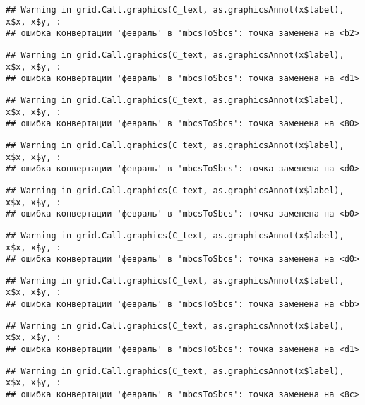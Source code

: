 \documentclass[
]{article}
\begin{document}
\begin{verbatim}
## Warning in grid.Call.graphics(C_text, as.graphicsAnnot(x$label), x$x, x$y, :
## ошибка конвертации 'февраль' в 'mbcsToSbcs': точка заменена на <b2>
\end{verbatim}

\begin{verbatim}
## Warning in grid.Call.graphics(C_text, as.graphicsAnnot(x$label), x$x, x$y, :
## ошибка конвертации 'февраль' в 'mbcsToSbcs': точка заменена на <d1>
\end{verbatim}

\begin{verbatim}
## Warning in grid.Call.graphics(C_text, as.graphicsAnnot(x$label), x$x, x$y, :
## ошибка конвертации 'февраль' в 'mbcsToSbcs': точка заменена на <80>
\end{verbatim}

\begin{verbatim}
## Warning in grid.Call.graphics(C_text, as.graphicsAnnot(x$label), x$x, x$y, :
## ошибка конвертации 'февраль' в 'mbcsToSbcs': точка заменена на <d0>
\end{verbatim}

\begin{verbatim}
## Warning in grid.Call.graphics(C_text, as.graphicsAnnot(x$label), x$x, x$y, :
## ошибка конвертации 'февраль' в 'mbcsToSbcs': точка заменена на <b0>
\end{verbatim}

\begin{verbatim}
## Warning in grid.Call.graphics(C_text, as.graphicsAnnot(x$label), x$x, x$y, :
## ошибка конвертации 'февраль' в 'mbcsToSbcs': точка заменена на <d0>
\end{verbatim}

\begin{verbatim}
## Warning in grid.Call.graphics(C_text, as.graphicsAnnot(x$label), x$x, x$y, :
## ошибка конвертации 'февраль' в 'mbcsToSbcs': точка заменена на <bb>
\end{verbatim}

\begin{verbatim}
## Warning in grid.Call.graphics(C_text, as.graphicsAnnot(x$label), x$x, x$y, :
## ошибка конвертации 'февраль' в 'mbcsToSbcs': точка заменена на <d1>
\end{verbatim}

\begin{verbatim}
## Warning in grid.Call.graphics(C_text, as.graphicsAnnot(x$label), x$x, x$y, :
## ошибка конвертации 'февраль' в 'mbcsToSbcs': точка заменена на <8c>
\end{verbatim}
\end{document}
